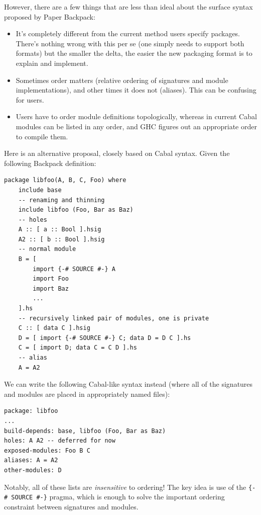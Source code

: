 \documentclass{article}
\begin{document}
However, there are a few things that are less than ideal about the
surface syntax proposed by Paper Backpack:

\begin{itemize}
    \item It's completely different from the current method users
        specify packages. There's nothing wrong with this per se
        (one simply needs to support both formats) but the smaller
        the delta, the easier the new packaging format is to explain
        and implement.

    \item Sometimes order matters (relative ordering of signatures and
        module implementations), and other times it does not (aliases).
        This can be confusing for users.

    \item Users have to order module definitions topologically,
        whereas in current Cabal modules can be listed in any order, and
        GHC figures out an appropriate order to compile them.
\end{itemize}

Here is an alternative proposal, closely based on Cabal syntax.  Given
the following Backpack definition:

\begin{verbatim}
package libfoo(A, B, C, Foo) where
    include base
    -- renaming and thinning
    include libfoo (Foo, Bar as Baz)
    -- holes
    A :: [ a :: Bool ].hsig
    A2 :: [ b :: Bool ].hsig
    -- normal module
    B = [
        import {-# SOURCE #-} A
        import Foo
        import Baz
        ...
    ].hs
    -- recursively linked pair of modules, one is private
    C :: [ data C ].hsig
    D = [ import {-# SOURCE #-} C; data D = D C ].hs
    C = [ import D; data C = C D ].hs
    -- alias
    A = A2
\end{verbatim}

We can write the following Cabal-like syntax instead (where
all of the signatures and modules are placed in appropriately
named files):

\begin{verbatim}
package: libfoo
...
build-depends: base, libfoo (Foo, Bar as Baz)
holes: A A2 -- deferred for now
exposed-modules: Foo B C
aliases: A = A2
other-modules: D
\end{verbatim}

Notably, all of these lists are \emph{insensitive} to ordering!
The key idea is use of the \verb|{-# SOURCE #-}| pragma, which
is enough to solve the important ordering constraint between
signatures and modules.
\end{document}
